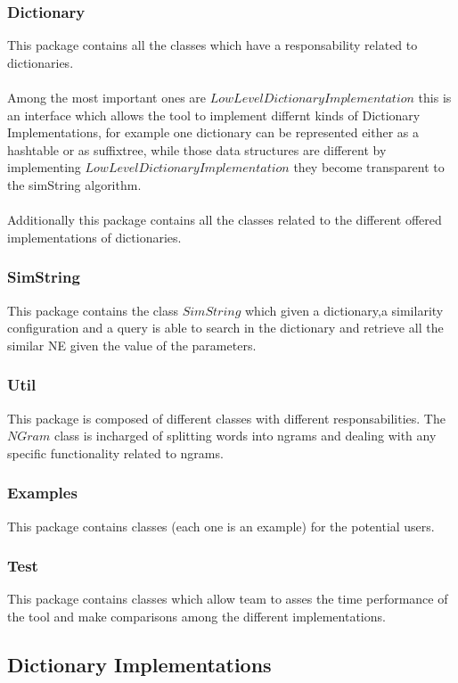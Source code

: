\subsubsection*{Dictionary}
This package contains all the classes which have a responsability related to dictionaries.\\
\\
Among the most important ones are $LowLevelDictionaryImplementation$ this is an interface
which allows the tool to implement differnt kinds of Dictionary Implementations, for example
one dictionary can be represented either as a hashtable or as suffixtree, while those
data structures are different by implementing $LowLevelDictionaryImplementation$ they become
transparent to the simString algorithm.\\
\\
Additionally this package contains all the classes related to the different offered implementations
of dictionaries.




\subsubsection*{SimString}
This package contains the class $SimString$ which given a dictionary,a similarity configuration  and a query
is able to search in the dictionary and retrieve all the similar NE given the value of the parameters.


\subsubsection*{Util}
This package is composed of different classes with different responsabilities.
The $NGram$ class is incharged of splitting words into ngrams and dealing with any specific functionality related to ngrams.

\subsubsection*{Examples}
This package contains classes (each one is an example) for the potential users.

\subsubsection*{Test}
This package contains classes which allow team to asses the time performance of the tool and make comparisons among the different implementations.


\subsection{Dictionary Implementations}



